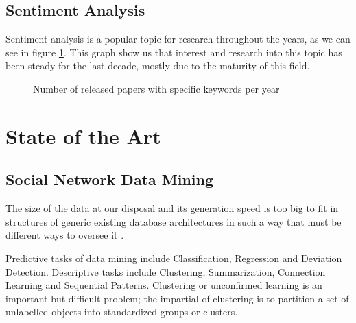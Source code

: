 \documentclass[runningheads]{llncs}
\begin{document}
\subsection{Sentiment Analysis}

Sentiment analysis is a popular topic for research throughout the years, as we can see in figure \ref{fig:released_papers_sa}. This graph show us that interest and research into this topic has been steady for the last decade, mostly due to the maturity of this field.

\begin{figure}[htb]
\caption{Number of released papers with specific keywords per year}
\label{fig:released_papers_sa}
\end{figure}

\section{State of the Art}

\subsection{Social Network Data Mining}

The size of the data at our disposal and its generation speed is too big to fit in structures of generic existing database architectures in such a way that must be different ways to oversee it \cite{Tappe2016AnalysisAD}.

Predictive tasks of data mining include Classification, Regression and Deviation Detection. Descriptive tasks include Clustering, Summarization, Connection Learning and Sequential Patterns. Clustering or unconfirmed learning is an important but difficult problem; the impartial of clustering is to partition a set of unlabelled objects into standardized groups or clusters. 
\end{document}
